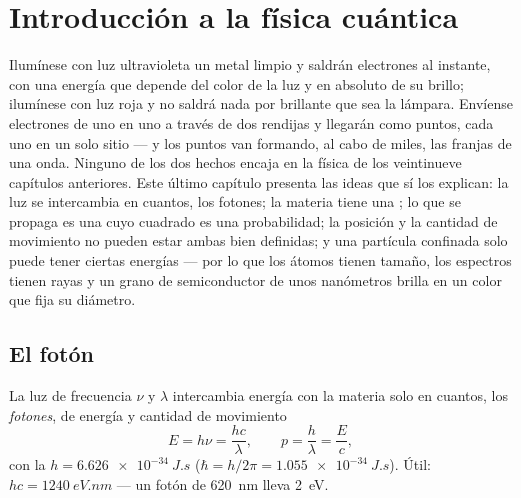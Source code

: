 \chapter{Introducción a la física cuántica}\label{ch:b1:quantum-introduction}

Ilumínese con luz ultravioleta un metal limpio y saldrán electrones al
instante, con una energía que depende del color de la luz y en absoluto
de su brillo; ilumínese con luz roja y no saldrá nada por brillante que
sea la lámpara. Envíense electrones de uno en uno a través de dos
rendijas y llegarán como puntos, cada uno en un solo sitio --- y los
puntos van formando, al cabo de miles, las franjas de una onda. Ninguno
de los dos hechos encaja en la física de los veintinueve capítulos
anteriores. Este último capítulo presenta las ideas que sí los explican:
la luz se intercambia en cuantos, los fotones; la materia tiene una
; lo que se propaga es una  cuyo cuadrado es una
probabilidad; la posición y la cantidad de movimiento no pueden estar
ambas bien definidas; y una partícula confinada solo puede tener ciertas
energías --- por lo que los átomos tienen tamaño, los espectros tienen
rayas y un grano de semiconductor de unos nanómetros brilla en un color
que fija su diámetro.

\section{El fotón}

\begin{theorem}\label{thm:b1:quantum-introduction:photon}
La luz de frecuencia $\nu$ y  $\lambda$ intercambia
energía con la materia solo en cuantos, los \emph{fotones}, de energía y
cantidad de movimiento
\[
E = h\nu = \frac{hc}{\lambda} , \qquad p = \frac{h}{\lambda} = \frac{E}{c} ,
\]
con la \emph{} $h = \qty{6.626e-34}{J.s}$ ($\hbar = h/2\pi =
\qty{1.055e-34}{J.s}$). Útil: $hc = \qty{1240}{eV.nm}$ --- un fotón de
\qty{620}{nm} lleva \qty{2}{eV}.
\end{theorem}
\admitted

